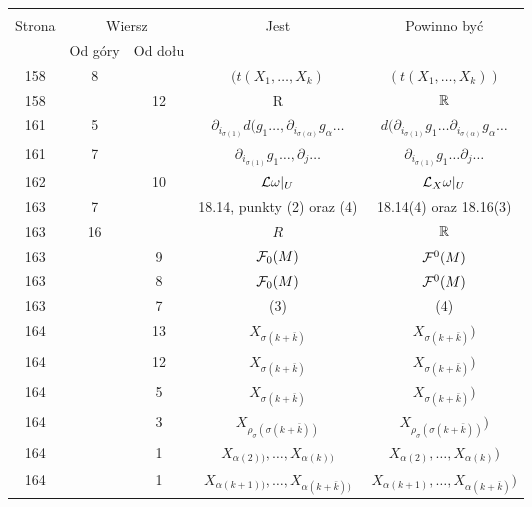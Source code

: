\documentclass[a4paper,11pt]{article}
\begin{document}
\begin{center}
  \begin{tabular}{|c|c|c|c|c|}
    \hline
    & \multicolumn{2}{c|}{} & & \\
    Strona & \multicolumn{2}{c|}{Wiersz} & Jest
                              & Powinno być \\ \cline{2-3}
    & Od góry & Od dołu & & \\
            \hline
      158 &  8 & & $( t( X_{ 1 }, \ldots, X_{ k } )$
           & $( t( X_{ 1 }, \ldots, X_{ k } ) )$ \\
    158 & & 12 & R & $\mathbb{R}$ \\
    161 &  5 & & $\partial_{ i_{ \sigma( 1 ) } } d( g_{ 1 } \ldots,
                 \partial_{ i_{ \sigma( \alpha ) } } g_{ \alpha } \ldots$
           & $d( \partial_{ i_{ \sigma( 1 ) } } g_{ 1 } \ldots
             \partial_{ i_{ \sigma( \alpha ) } } g_{ \alpha } \ldots$ \\
    161 &  7 & & $\partial_{ i_{ \sigma( 1 ) } } g_{ 1 } \ldots, \partial_{ j }\ldots$
           & $\partial_{ i_{ \sigma( 1 ) } } g_{ 1 } \ldots \partial_{ j }\ldots$ \\
    162 & & 10 & $\mathcal{L} \omega |_{ U }$ & $\mathcal{L}_{ X } \omega|_{ U }$ \\
    163 &  7 & & 18.14, punkty (2) oraz (4) & 18.14(4) oraz 18.16(3) \\
    163 & 16 & & $R$ & $\mathbb{R}$ \\
    163 & &  9 & $\mathcal{F}_{ 0 }( M )$ & $\mathcal{F}^{ 0 }( M )$ \\
    163 & &  8 & $\mathcal{F}_{ 0 }( M )$ & $\mathcal{F}^{ 0 }( M )$ \\
    163 & &  7 & (3) & (4) \\
    164 & & 13 & $X_{ \sigma( k + \bar{ k } ) }$
           & $X_{ \sigma( k + \bar{ k } ) } )$ \\
    164 & & 12 & $X_{ \sigma( k + \bar{ k } ) }$
           & $X_{ \sigma( k + \bar{ k } ) } )$ \\
    164 & &  5 & $X_{ \sigma( k + \bar{ k } ) }$
           & $X_{ \sigma( k + \bar{ k } ) } )$ \\
    164 & &  3 & $X_{ \rho_{ \sigma }( \sigma( k + \bar{ k } ) ) }$
           & $X_{ \rho_{ \sigma }( \sigma( k + \bar{ k } ) ) } )$ \\
    164 & &  1 & $X_{ \alpha( 2 ) ) }, \ldots, X_{ \alpha( k ) ) }$
           & $X_{ \alpha( 2 ) }, \ldots, X_{ \alpha( k ) } )$ \\
    164 & &  1 & $X_{ \alpha( k + 1 ) ) }, \ldots, X_{ \alpha( k + \bar{ k } ) ) }$
           & $X_{ \alpha( k + 1 ) }, \ldots, X_{ \alpha( k + \bar{ k } ) } )$ \\

\end{tabular}
\end{center}
\end{document}
